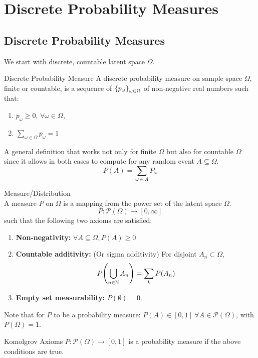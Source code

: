 \newpage
\section{Discrete Probability Measures}
\subsection{Discrete Probability Measures}
We start with discrete, countable latent space $\Omega$. \\

\begin{df}{Discrete Probability Measure}
A discrete probability measure on sample space \(\Omega\), finite or countable, is a sequence of \(\qty{p_\omega}_{\omega \in \Omega}\) of non-negative real numbers such that:
\begin{enumerate}
	\item \(p_\omega \geq 0\), \(\forall \omega \in \Omega\),
	\item \(\sum_{\omega \in \Omega} p_\omega = 1\)
\end{enumerate}
A general definition that works not only for finite $\Omega$ but also for countable $\Omega$ since it allows in both cases to compute for any random event $A\subseteq \Omega$. 
$$P(A) = \sum_{\omega\in A}P_\omega$$
\end{df}

\begin{df}{Measure/Distribution}\\
A measure \(P\) on \(\Omega\) is a mapping from the power set of the latent space $\Omega$. 
$$P: \mathscr{P}(\Omega) \to [0, \infty]$$
such that the following two axioms are satisfied:
\begin{enumerate}
	\item \textbf{Non-negativity:} $\forall A \subseteq \Omega, P(A)\geq 0$
	\item \textbf{Countable additivity:} (Or sigma additivity) For disjoint $A_n \subset \Omega$, 
	$$P\qty(\bigcup_{n\in\mathbb{N}} A_n) = \sum_k P(A_n)$$
	\item \textbf{Empty set measurability: } $P(\emptyset) = 0$. 
\end{enumerate}
 Note that for $P$ to be a probability measure: $P(A) \in [0, 1] \ \forall A\in \mathscr{P}(\Omega)$, with $P(\Omega) = 1$.
\end{df}

\begin{thm}{Komolgrov Axioms}
	$P:\mathscr{P}(\Omega) \rightarrow [0, 1]$ is a probability measure if the above conditions are true. 
\end{thm}

